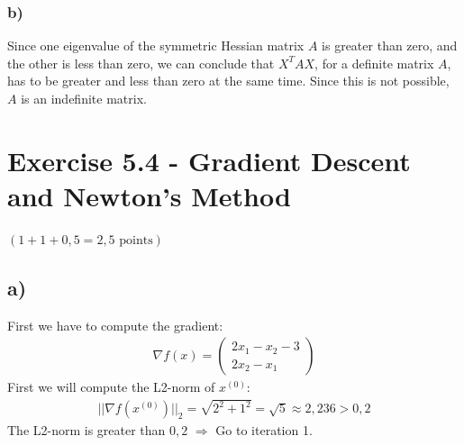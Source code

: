 \documentclass[a4paper]{article}
\begin{document}
        \subsubsection*{b)}
            Since one eigenvalue of the symmetric Hessian matrix $A$ is greater than zero, and the other is less than zero, we can conclude that $X^T A X$, for a definite matrix $A$, has to be greater and less than zero at the same time.
            Since this is not possible, $A$ is an indefinite matrix.
            


\newpage
\section*{Exercise 5.4 - Gradient Descent and Newton's Method}
$(1+1+0,5 = 2,5 \text{ points})$
    \subsection*{a)}
        First we have to compute the gradient:
        \begin{align}
            \nabla f(x) = \left( \begin{matrix} 2x_1 - x_2 -3 \\ 2x_2 - x_1 \end{matrix} \right)
        \end{align}
        First we will compute the L2-norm of $x^{(0)}$:
            \begin{align*}
                ||\nabla f(x^{(0)})||_2 = \sqrt{2^2 + 1^2} = \sqrt{5} \approx 2,236 > 0,2
            \end{align*}
            The L2-norm is greater than $0,2$ $\Rightarrow$ Go to iteration 1.
\end{document}

